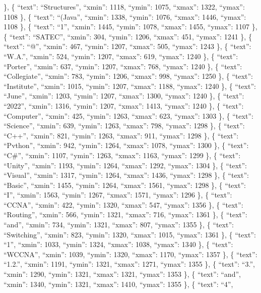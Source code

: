 \documentclass[
]{article}
\begin{document}
\}, \{ ``text'': ``Structures'', ``xmin'': 1118, ``ymin'': 1075,
``xmax'': 1322, ``ymax'': 1108 \}, \{ ``text'': ``(Java'', ``xmin'':
1338, ``ymin'': 1076, ``xmax'': 1446, ``ymax'': 1108 \}, \{ ``text'':
``1'', ``xmin'': 1445, ``ymin'': 1078, ``xmax'': 1455, ``ymax'': 1107
\}, \{ ``text'': ``SATEC'', ``xmin'': 304, ``ymin'': 1206, ``xmax'':
451, ``ymax'': 1241 \}, \{ ``text'': ``@'', ``xmin'': 467, ``ymin'':
1207, ``xmax'': 505, ``ymax'': 1243 \}, \{ ``text'': ``W.A.'', ``xmin'':
524, ``ymin'': 1207, ``xmax'': 619, ``ymax'': 1240 \}, \{ ``text'':
``Porter'', ``xmin'': 637, ``ymin'': 1207, ``xmax'': 768, ``ymax'': 1240
\}, \{ ``text'': ``Collegiate'', ``xmin'': 783, ``ymin'': 1206,
``xmax'': 998, ``ymax'': 1250 \}, \{ ``text'': ``Institute'', ``xmin'':
1015, ``ymin'': 1207, ``xmax'': 1188, ``ymax'': 1240 \}, \{ ``text'':
``June'', ``xmin'': 1203, ``ymin'': 1207, ``xmax'': 1300, ``ymax'': 1240
\}, \{ ``text'': ``2022'', ``xmin'': 1316, ``ymin'': 1207, ``xmax'':
1413, ``ymax'': 1240 \}, \{ ``text'': ``Computer'', ``xmin'': 425,
``ymin'': 1263, ``xmax'': 623, ``ymax'': 1303 \}, \{ ``text'':
``Science'', ``xmin'': 639, ``ymin'': 1263, ``xmax'': 798, ``ymax'':
1298 \}, \{ ``text'': ``C++'', ``xmin'': 821, ``ymin'': 1263, ``xmax'':
911, ``ymax'': 1298 \}, \{ ``text'': ``Pvthon'', ``xmin'': 942,
``ymin'': 1264, ``xmax'': 1078, ``ymax'': 1300 \}, \{ ``text'': ``C\#'',
``xmin'': 1107, ``ymin'': 1263, ``xmax'': 1163, ``ymax'': 1299 \}, \{
``text'': ``Unity'', ``xmin'': 1193, ``ymin'': 1264, ``xmax'': 1292,
``ymax'': 1304 \}, \{ ``text'': ``Visual'', ``xmin'': 1317, ``ymin'':
1264, ``xmax'': 1436, ``ymax'': 1298 \}, \{ ``text'': ``Basic'',
``xmin'': 1455, ``ymin'': 1264, ``xmax'': 1561, ``ymax'': 1298 \}, \{
``text'': ``I'', ``xmin'': 1563, ``ymin'': 1267, ``xmax'': 1571,
``ymax'': 1296 \}, \{ ``text'': ``CCNA'', ``xmin'': 422, ``ymin'': 1320,
``xmax'': 547, ``ymax'': 1356 \}, \{ ``text'': ``Routing'', ``xmin'':
566, ``ymin'': 1321, ``xmax'': 716, ``ymax'': 1361 \}, \{ ``text'':
``and'', ``xmin'': 734, ``ymin'': 1321, ``xmax'': 807, ``ymax'': 1355
\}, \{ ``text'': ``Switching'', ``xmin'': 823, ``ymin'': 1320, ``xmax'':
1015, ``ymax'': 1361 \}, \{ ``text'': ``1'', ``xmin'': 1033, ``ymin'':
1324, ``xmax'': 1038, ``ymax'': 1340 \}, \{ ``text'': ``WCCNA'',
``xmin'': 1039, ``ymin'': 1320, ``xmax'': 1170, ``ymax'': 1357 \}, \{
``text'': ``1.2.'', ``xmin'': 1191, ``ymin'': 1321, ``xmax'': 1271,
``ymax'': 1355 \}, \{ ``text'': ``3.'', ``xmin'': 1290, ``ymin'': 1321,
``xmax'': 1321, ``ymax'': 1353 \}, \{ ``text'': ``and'', ``xmin'': 1340,
``ymin'': 1321, ``xmax'': 1410, ``ymax'': 1355 \}, \{ ``text'': ``4'',
\end{document}
